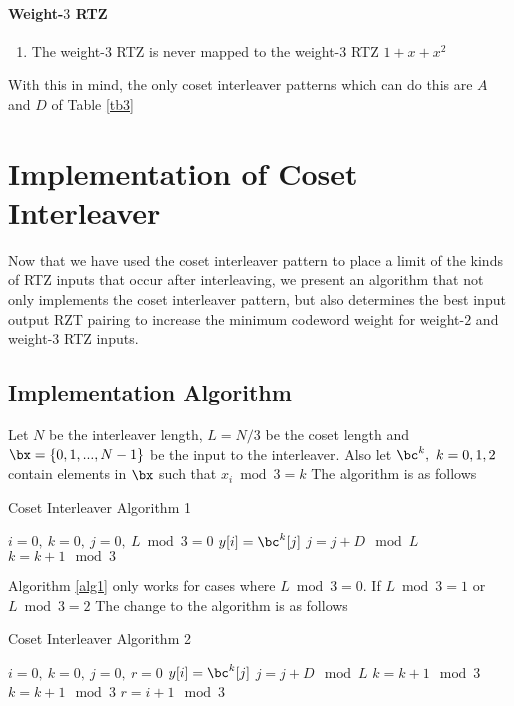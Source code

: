 \documentclass[11pt, oneside, dvipdfmx]{book}
\begin{document}
\paragraph{Weight-$3$ RTZ}
\begin{enumerate}
\item The weight-$3$ RTZ is never mapped to the weight-$3$ RTZ $1+x+x^2$
\end{enumerate}

With this in mind, the only coset interleaver patterns which can do this are $A$ and $D$ of Table \ref{tb3}

\section{Implementation of Coset Interleaver}
Now that we have used the coset interleaver pattern to place a limit of the kinds of RTZ inputs that occur after interleaving, we present an algorithm that not only implements the coset interleaver pattern, but also determines the best input output RZT pairing to increase the minimum codeword weight for weight-$2$ and weight-$3$ RTZ inputs.

\subsection{Implementation Algorithm}
Let $N$ be the interleaver length, $L=N/3$ be the coset length and $\bx =\{0,1,...,N-1\}$ be the input to the interleaver. Also let $\bc^k,~k=0,1,2$ contain elements in $\bx$ such that $x_i \bmod 3 = k$
The algorithm is as follows

\begin{algorithm}
    \caption{Coset Interleaver Algorithm 1}
    \label{alg1}
\begin{algorithmic}
    \REQUIRE	 $i=0,~k=0,~j=0,~L \bmod 3 = 0$
    \STATE $y[i] = \bc^k[j]$
    \STATE $j=j+D \mod L$
    \STATE $k=k+1 \mod 3$
    \ENDIF
    \ENDFOR
\end{algorithmic}
\end{algorithm}
Algorithm \ref{alg1} only works for cases where $L \bmod 3 = 0$. If $L \bmod 3 =1$ or $L \bmod 3 =2$ The change to the algorithm is as follows

\begin{algorithm}
    \caption{Coset Interleaver Algorithm 2}
    \label{alg2}
\begin{algorithmic}
    \REQUIRE	 $i=0,~k=0,~j=0,~r=0$
    \STATE $y[i] = \bc^k[j]$
    \STATE $j=j+D \mod L$
    \STATE $k=k+1 \mod 3$
    \STATE $k=k+1 \mod 3$
    \STATE $r=i+1 \mod 3$
    \ENDIF
    \ENDFOR
\end{algorithmic}
\end{algorithm}
\end{document}
